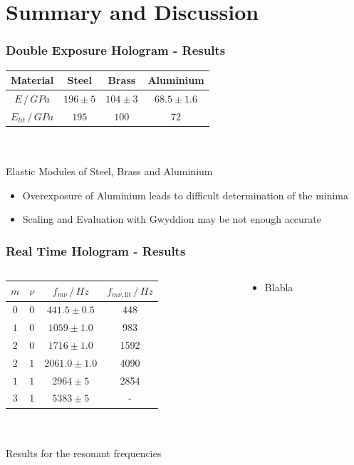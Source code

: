 \documentclass[10pt]{beamer}
\begin{document}
\section{Summary and Discussion}
\frame{\tableofcontents[currentsection]}
\begin{frame}
	\frametitle{Double Exposure Hologram - Results}
	\begin{table}
		\begin{tabular}{c|ccc}
			Material&Steel&Brass&Aluminium\\\hline
			$E\,/\,\si{GPa}$&$196\pm5$&$104\pm3$&$68.5\pm1.6$\\
			$E_{lit}\,/\,\si{GPa}$\footfullcite{staats}&$195$&$100$&$72$
		\end{tabular}\\\scriptsize\ \\
		{\small Elastic Modules of Steel, Brass and Aluminium}
	\end{table}
	\pause
	\begin{itemize}
		\item Overexposure of Aluminium leads to difficult determination of the minima
		\pause
		\item Scaling and Evaluation with Gwyddion may be not enough accurate
	\end{itemize}
\end{frame}
\begin{frame}
	\frametitle{Real Time Hologram - Results}
	\begin{columns}
		\begin{column}{0.6\textwidth}
			\begin{table}
				\centering
				\begin{tabular}{c|c|c|c}
					$m$ & $\nu$ 		& $f_{m\nu}\,/\,\si{Hz}$ 	& $f_{m\nu, \text{lit}}\,/\,\si{Hz}$\\ \hline\hline
					$0$&$0$	& $441.5\pm0.5$					& 448	\\ \hline
					$1$&$0$	& $1059\pm1.0$				& 983	\\ \hline
					$2$&$0$	& $1716\pm1.0$				& 1592	\\ \hline
					$2$&$1$	& $2061.0\pm1.0$				& 4090	\\ \hline
					$1$&$1$	& $2964\pm5$				& 2854 \\ \hline
					$3$&$1$	& $5383\pm5$				&-
				\end{tabular}\\\scriptsize\ \\\small
				{Results for the resonant frequencies\footnotemark}
			\end{table}		
		\end{column}
		\pause
		\begin{column}{0.5\textwidth}
			\begin{itemize}
				\item Blabla
			\end{itemize}
		\end{column}
	\end{columns}
\end{frame}
\end{document}
